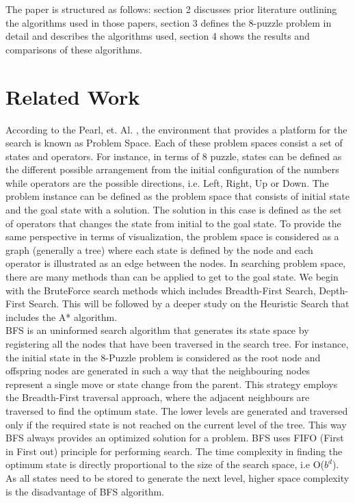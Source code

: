 \documentclass{svproc}
\begin{document}
\noindent The paper is structured as follows: section 2 discusses prior literature outlining the algorithms used in those papers,  section 3 defines the 8-puzzle problem in detail and describes the algorithms used, section 4 shows the results and comparisons of these algorithms.

\section{Related Work}
\noindent According to the Pearl, et. Al. , the environment that provides a platform for the search is known as Problem Space. Each of these problem spaces consist a set of states and operators. For instance, in terms of 8 puzzle, states can be defined as the different possible arrangement from the initial configuration of the numbers while operators are the possible directions, i.e. Left, Right, Up or Down. The problem instance can be defined as the problem space that consists of initial state and the goal state with a solution. The solution in this case is defined as the set of operators that changes the state from initial to the goal state. To provide the same perspective in terms of visualization, the problem space is considered as a graph (generally a tree) where each state is defined by the node and each operator is illustrated as an edge between the nodes. In searching problem space, there are many methods than can be applied to get to the goal state. We begin with the BruteForce search methods which includes Breadth-First Search, Depth-First Search. This will be followed by a deeper study on the Heuristic Search that includes the A* algorithm.\\

\noindent BFS is an uninformed search algorithm that generates its state space by registering all the nodes that have been traversed in the search tree. For instance, the initial state in the 8-Puzzle problem is considered as the root node and offspring nodes are generated in such a way that the neighbouring nodes represent a single move or state change from the parent. This strategy employs the Breadth-First traversal approach, where the adjacent neighbours are traversed to find the optimum state. The lower levels are generated and traversed only if the required state is not reached on the current level of the tree. This way BFS always provides an optimized solution for a problem. BFS uses FIFO (First in First out) principle for performing search. The time complexity in finding the optimum state is directly proportional to the size of the search space, i.e O($b^{d}$). As all states need to be stored to generate the next level, higher space complexity is the disadvantage of BFS algorithm.\\
\end{document}
